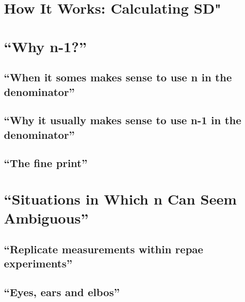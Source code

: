\documentclass[]{book}
\theoremstyle{definition}
\theoremstyle{definition}
\theoremstyle{definition}
\theoremstyle{remark}
\begin{document}
\section{How It Works: Calculating
SD"}\label{how-it-works-calculating-sd}

\section{\texorpdfstring{``Why n-1?''}{Why n-1?}}\label{why-n-1}

\subsection{\texorpdfstring{``When it somes makes sense to use n in the
denominator''}{When it somes makes sense to use n in the denominator}}\label{when-it-somes-makes-sense-to-use-n-in-the-denominator}

\subsection{\texorpdfstring{``Why it usually makes sense to use n-1 in
the
denominator''}{Why it usually makes sense to use n-1 in the denominator}}\label{why-it-usually-makes-sense-to-use-n-1-in-the-denominator}

\subsection{\texorpdfstring{``The fine
print''}{The fine print}}\label{the-fine-print}

\section{\texorpdfstring{``Situations in Which n Can Seem
Ambiguous''}{Situations in Which n Can Seem Ambiguous}}\label{situations-in-which-n-can-seem-ambiguous}

\subsection{\texorpdfstring{``Replicate measurements within repae
experiments''}{Replicate measurements within repae experiments}}\label{replicate-measurements-within-repae-experiments}

\subsection{\texorpdfstring{``Eyes, ears and
elbos''}{Eyes, ears and elbos}}\label{eyes-ears-and-elbos}
\end{document}
